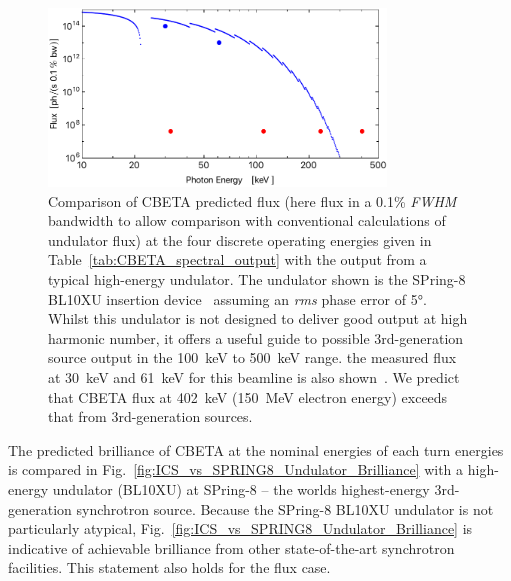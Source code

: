 \documentclass[../main.tex]{subfiles}
\begin{document}
\begin{figure}[!h]
\centering
\includegraphics[width=0.8\textwidth]{Figures/CBETA_Inverse_Compton_Source_Design/spring8bl10fluxplot.pdf}
\caption{Comparison of CBETA predicted flux (here flux in a 0.1\% \textit{FWHM} bandwidth to allow comparison with conventional calculations of undulator flux) at the four discrete operating energies given in Table~\ref{tab:CBETA_spectral_output} with the output from a typical high-energy undulator. The undulator shown is the SPring-8 BL10XU insertion device~\cite{spring8beamlines} assuming an \textit{rms} phase error of 5\si{\degree}. Whilst this undulator is not designed to deliver good output at high harmonic number, it offers a useful guide to possible 3rd-generation source output in the 100~\si{\kilo\electronvolt} to 500~\si{\kilo\electronvolt} range. the measured flux at 30~\si{\kilo\electronvolt} and 61~\si{\kilo\electronvolt} for this beamline is also shown~\cite{spring8beamlines}. We predict that CBETA flux at 402~\si{\kilo\electronvolt} (150~\si{\mega\electronvolt} electron energy) exceeds that from 3rd-generation sources.}
\label{fig:ICS_vs_SPRING8_Undulator_Flux}
\end{figure}

The predicted brilliance of CBETA at the nominal energies of each turn energies is compared in Fig.~\ref{fig:ICS_vs_SPRING8_Undulator_Brilliance} with a high-energy undulator (BL10XU) at SPring-8 -- the worlds highest-energy 3rd-generation synchrotron source. Because the SPring-8 BL10XU undulator is not particularly atypical, Fig.~\ref{fig:ICS_vs_SPRING8_Undulator_Brilliance} is indicative of achievable brilliance from other state-of-the-art synchrotron facilities. This statement also holds for the flux case.
\end{document}
